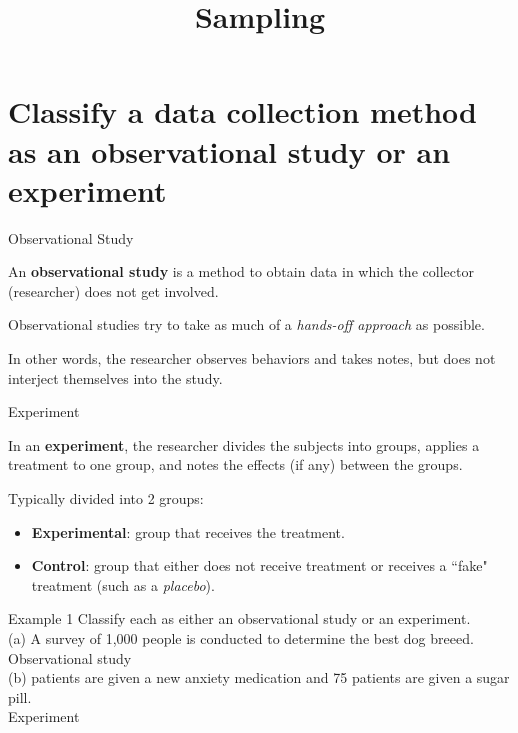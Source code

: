 \documentclass[t]{beamer}
\title{Sampling}
\author{}
\date{}
\begin{document}
\begin{frame} 
\maketitle
\end{frame}

\section{Classify a data collection method as an observational study or an experiment}

\begin{frame}{Observational Study}
\begin{tcolorbox}[colframe=green!20!black, colback = green!30!white,title=\textbf{Observational Study}]
An \textbf{observational study} is a method to obtain data in which the collector (researcher) does not get involved.
\end{tcolorbox}
\vspace{8pt} \pause

Observational studies try to take as much of a \textit{hands-off approach} as possible. \newline\\	\pause

In other words, the researcher observes behaviors and takes notes, but does not interject themselves into the study. 
\end{frame}

\begin{frame}{Experiment}
\begin{tcolorbox}[colframe=green!20!black, colback = green!30!white,title=\textbf{Experiment}]
In an \textbf{experiment}, the researcher divides the subjects into groups, applies a treatment to one group, and notes the effects (if any) between the groups.
\end{tcolorbox}
\vspace{8pt}	\pause
Typically divided into 2 groups:
\begin{itemize}
	\item \textbf{Experimental}: group that receives the treatment.	\pause
	\item \textbf{Control}: group that either does not receive treatment or receives a ``fake" treatment (such as a \textit{placebo}).
\end{itemize}
\end{frame}

\begin{frame}{Example 1}
Classify each as either an observational study or an experiment.	\newline\\	\pause
(a)	\quad A survey of 1,000 people is conducted to determine the best dog breeed. \newline\\	\pause
Observational study \newline\\ \pause
(b)	 patients are given a new anxiety medication and 75 patients are given a sugar pill.	\newline\\	\pause
Experiment
\end{frame}
\end{document}
